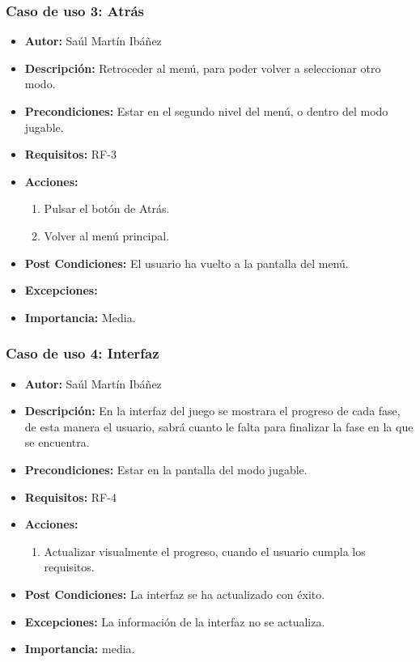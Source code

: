 \subsubsection{Caso de uso 3: Atrás}
 \begin{itemize}
 	\item \textbf{Autor:} Saúl Martín Ibáñez
 	\item \textbf{Descripción:} Retroceder al menú, para poder volver a seleccionar otro modo.
 	\item \textbf{Precondiciones:} Estar en el segundo nivel del menú, o dentro del modo jugable.
 	\item \textbf{Requisitos:} RF-3
 	\item \textbf{Acciones:}
 	\begin{enumerate}
 		\item Pulsar el botón de Atrás.
 		\item Volver al menú principal.
 	\end{enumerate}
 	\item \textbf{Post Condiciones:} El usuario ha vuelto a la pantalla del menú.
 	\item \textbf{Excepciones:}	
 	\item \textbf{Importancia:} Media.
 \end{itemize}
\subsubsection{Caso de uso 4: Interfaz}
\begin{itemize}
	\item \textbf{Autor:} Saúl Martín Ibáñez
	\item \textbf{Descripción:} En la interfaz del juego se mostrara el progreso de cada fase, de esta manera el usuario, sabrá cuanto le falta para finalizar la fase en la que se encuentra.
	\item \textbf{Precondiciones:} Estar en la pantalla del modo jugable.
	\item \textbf{Requisitos:} RF-4
	\item \textbf{Acciones:}
	\begin{enumerate}
		\item Actualizar visualmente el progreso, cuando el usuario cumpla los requisitos.
	\end{enumerate}
	\item \textbf{Post Condiciones:} La interfaz se ha actualizado con éxito.
	\item \textbf{Excepciones:} La información de la interfaz no se actualiza.
	\item \textbf{Importancia:} media.
\end{itemize}
